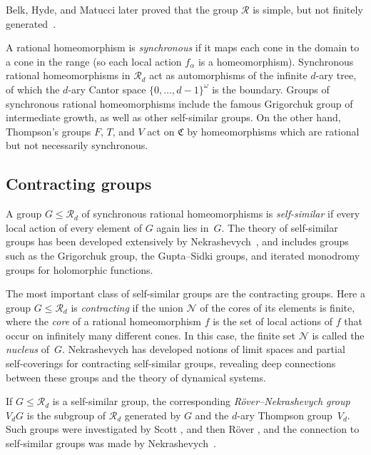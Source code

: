 \documentclass[usenames,dvipsnames]{amsart}
\theoremstyle{definition}
\newcommand{\C}{\mathfrak{C}}
\begin{document}
Belk, Hyde, and Matucci later proved that the group $\mathscr{R}$ is simple, but not finitely generated~\cite{Belk-Hyde-Matucci-1}.  

A rational homeomorphism is \textit{synchronous} if it maps each cone in the domain to a cone in the range (so each local action $f_\alpha$ is a homeomorphism).  Synchronous rational homeomorphisms in $\mathscr{R}_d$ act as automorphisms of the infinite $d$-ary tree, of which the $d$-ary Cantor space $\{0,\ldots,d-1\}^\omega$ is the boundary.  Groups of synchronous rational homeomorphisms include the famous Grigorchuk group of intermediate growth, as well as other self-similar groups.  On the other hand, Thompson's groups $F$, $T$, and $V$ act on $\C$ by homeomorphisms which are rational but not necessarily synchronous.

\subsection{Contracting groups}

A group $G\leq \mathscr{R}_d$ of synchronous rational homeomorphisms is \textit{self-similar} if every local action of every element of $G$ again lies in~$G$.  The theory of self-similar groups has been developed extensively by Nekrashevych~\cite{Nekrashevych-book}, and includes groups such as the Grigorchuk group, the Gupta--Sidki groups, and iterated monodromy groups for holomorphic functions.

The most important class of self-similar groups are the contracting groups.  Here a group $G\leq\mathscr{R}_d$ is \textit{contracting} if the union $\mathcal{N}$ of the cores of its elements is finite, where the \textit{core} of a rational homeomorphism $f$ is the set of local actions of $f$ that occur on infinitely many different cones.  In this case, the finite set $\mathcal{N}$ is called the \textit{nucleus} of~$G$.  Nekrashevych has developed notions of limit spaces and partial self-coverings for contracting self-similar groups, revealing deep connections between these groups and the theory of dynamical systems.

If $G\leq\mathscr{R}_d$ is a self-similar group, the corresponding \textit{R\"over--Nekrashevych group} $V_dG$ is the subgroup of $\mathscr{R}_d$ generated by $G$ and the $d$-ary Thompson group~$V_d$.  Such groups were investigated by Scott \cite{Scott1,Scott2,Scott3}, and then R\"over \cite{roever}, and the connection to self-similar groups was made by Nekrashevych~\cite{NekraCuntz}.
\end{document}
